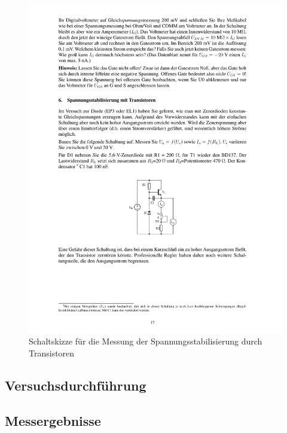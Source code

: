 \documentclass[12pt,a4paper]{article}
\begin{document}
\begin{figure}[H] 
  \centering
    \includegraphics[trim = 10mm 80mm 10mm 140mm, clip, scale = 1]{ep3_14[Page17].pdf}
  	\caption[Schaltskizze für die Messung der Spannungsstabilisierung durch Transistoren]{Schaltskizze für die Messung der Spannungsstabilisierung durch Transistoren\footnotemark}
  \label{fig:8}
\end{figure}

\subsection{Versuchsdurchführung}

\subsection{Messergebnisse}
\end{document}
